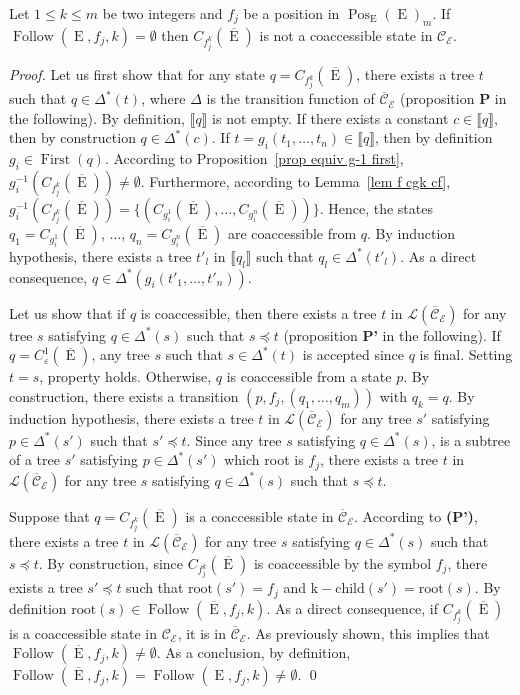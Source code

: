 \documentclass{llncs}
\def\Po#1#2{\Pos_{#1}{(#2)}}
\DeclareMathOperator{\E}{E}
\DeclareMathOperator{\First}{First}
\DeclareMathOperator{\Follow}{Follow}
\DeclareMathOperator{\Pos}{Pos}
\def\b#1{\overline{#1}}
\begin{document}
 
 \begin{lemma}\label{lem}
Let $1\leq k\leq m$ be two integers and $f_j$ be a position in $\Po{\E}{\E}_m$.
 If $\Follow(\E,f_j,k)= \emptyset$ then $C_{f_j^k}(\overline{\E})$ is not a coaccessible state in $\mathcal{C_{\E}}$.
 \end{lemma}
\begin{proof}
Let us first show that for any state $q=C_{f_j^k}(\b{\E})$, there exists a tree $t$ such that $q\in \Delta^*(t)$, where $\Delta$ is the transition function of $\mathcal{\b C_{\E}}$ (proposition \textbf{P} in the following). By definition, $\llbracket q \rrbracket$ is not empty. If there exists a constant $c\in\llbracket q \rrbracket$, then by construction $q\in\Delta^*(c)$. 
If $t=g_i(t_1,\ldots,t_n) \in \llbracket q \rrbracket$, then by definition $g_i \in \First(q)$. According to Proposition~\ref{prop equiv g-1 first}, $g_i^{-1}(C_{f^k_j}(\b \E))\neq\emptyset$. Furthermore, according to Lemma~\ref{lem f cgk cf}, $g_i^{-1}(C_{f^k_j}(\b \E))=\{(C_{g_i^1}(\b \E),\ldots,C_{g_i^n}(\b \E))\}$. Hence, the states $q_1=C_{g_i^1}(\b \E)$, $\ldots$, $q_n=C_{g_i^n}(\b \E)$ are coaccessible from $q$. By induction hypothesis, there exists a tree $t'_l$ in $\llbracket q_l \rrbracket$ such that $q_l\in \Delta^*(t'_l)$. As a direct consequence, $q\in\Delta^*(g_i(t'_1,\ldots,t'_n))$.

Let us show that if $q$ is coaccessible, then there exists a tree $t$ in $\mathcal{L}(\mathcal{\b C_{\E}})$ for any tree $s$ satisfying $q\in \Delta^*(s)$ such that $s\preccurlyeq t$ (proposition \textbf{P'} in the following). 
  If $q=C_{\varepsilon}^1(\b\E)$, any tree $s$ such that $s\in \Delta^*(t)$ is accepted since $q$ is final. Setting $t=s$, property holds. 
  Otherwise, $q$ is coaccessible from a state $p$. By construction, there exists a transition $(p,f_j,(q_1,\ldots,q_m))$ with $q_k=q$. By induction hypothesis, there exists a tree $t$ in $\mathcal{L}(\mathcal{\b C_{\E}})$ for any tree $s'$ satisfying $p\in \Delta^*(s')$ such that $s'\preccurlyeq t$. Since any tree $s$ satisfying $q\in \Delta^*(s)$, is a subtree of a tree $s'$ satisfying $p\in \Delta^*(s')$ which root is $f_j$, there exists a tree $t$ in $\mathcal{L}(\mathcal{\b C_{\E}})$ for any tree $s$ satisfying $q\in \Delta^*(s)$ such that $s\preccurlyeq t$.

Suppose that $q=C_{f_j^k}(\b{\E})$ is a coaccessible state in $\mathcal{\b C_{\E}}$. According to \textbf{(P')}, there exists a tree $t$ in $\mathcal{L}(\mathcal{\b C_{\E}})$ for any tree $s$ satisfying $q\in \Delta^*(s)$ such that $s\preccurlyeq t$. By construction, since $C_{f_j^k}(\b{\E})$ is coaccessible by the symbol $f_j$, there exists a tree $s'\preccurlyeq t$ such that $\mathrm{root}(s')=f_j$ and $\mathrm{k-child}(s')=\mathrm{root}(s)$. By definition $\mathrm{root}(s)\in \Follow(\b\E,f_j,k)$.
As a direct consequence, if $C_{f_j^k}(\b{\E})$ is a coaccessible state in $\mathcal{C_{\E}}$, it is in $\mathcal{\b C_{\E}}$. As previously shown, this implies that $\Follow(\b\E,f_j,k)\neq\emptyset$. As a conclusion, by definition, $\Follow(\b\E,f_j,k)=\Follow(\E,f_j,k)\neq\emptyset$.
  \qed
  
\end{proof}
\end{document}
